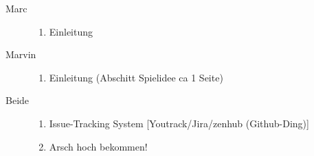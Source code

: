 \begin{description}
	\item[Marc]{
		\begin{enumerate}
			\item{ Einleitung }
		\end{enumerate}
	}
	\item[Marvin]{
		\begin{enumerate}
			\item{ Einleitung (Abschitt Spielidee ca 1 Seite) }
		\end{enumerate}
	}
	\item[Beide]{
		\begin{enumerate}
			\item{Issue-Tracking System [Youtrack/Jira/zenhub (Github-Ding)]}
			\item{Arsch hoch bekommen!}
		\end{enumerate}
	}
\end{description}
